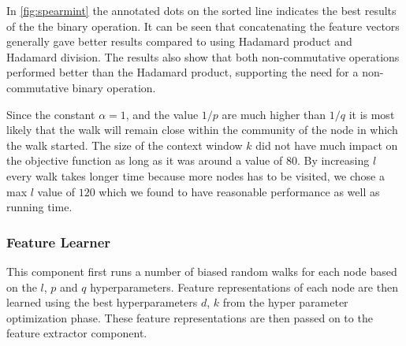 In \cref{fig:spearmint} the annotated dots on the sorted line indicates the best results of the the binary operation. It can be seen that concatenating the feature vectors generally gave better results compared to using Hadamard product and Hadamard division. The results also show that both non-commutative operations performed better than the Hadamard product, supporting the need for a non-commutative binary operation.

Since the constant $\alpha = 1$, and the value $1/p$ are much higher than $1/q$ it is most likely that the walk will remain close within the community of the node in which the walk started.
The size of the context window $k$ did not have much impact on the objective function as long as it was around a value of $80$.
By increasing $l$ every walk takes longer time because more nodes has to be visited, we chose a max $l$ value of $120$ which we found to have reasonable performance as well as running time.

\subsubsection{Feature Learner}
This component first runs a number of biased random walks for each node based on the $l$, $p$ and $q$ hyperparameters. Feature representations of each node are then learned using the best hyperparameters $d$, $k$ from the hyper parameter optimization phase. These feature representations are then passed on to the feature extractor component.

